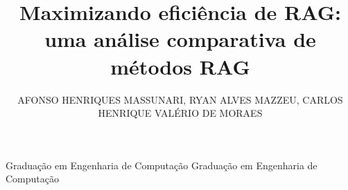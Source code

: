 \documentclass{ieeeaccess}
\begin{document}
\title{Maximizando eficiência de RAG: uma análise comparativa de métodos RAG}
\author{AFONSO HENRIQUES MASSUNARI,
        RYAN ALVES MAZZEU,
        CARLOS HENRIQUE VALÉRIO DE MORAES }

\markboth
{Graduação em Engenharia de Computação}
{Graduação em Engenharia de Computação}



\titlepgskip=-15pt

\maketitle











\EOD
\end{document}
